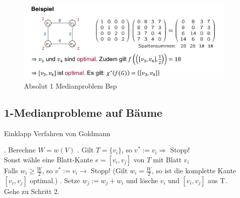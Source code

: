         \begin{exmp}
          
        \end{exmp}

        \begin{figure}[H]
          \centering
          \includegraphics[width=0.95\textwidth]{Images/Absolut_1_Medianproblem.png}
          \caption{Absolut 1 Medianproblem Bsp}
          \label{fig:Absolut_1_Medianproblem-Bsp}
        \end{figure}
       
    

    \subsection{1-Medianprobleme auf Bäume} %
    \label{sub:1_medianprobleme_auf_b_ume}

      \begin{algorithm}[H]
        \begin{algorithmic}
          \caption{Einklapp Verfahren von Goldmann}
          . Berechne $W = w(V)$
          . Gilt $T = \{v_i\}$, so $v^* := v_i \Rightarrow$ Stopp!\\ 
          Sonst wähle eine Blatt-Kante $e = [v_i, v_j]$ von $T$ mit Blatt $v_i$\\ 
          Falls $w_i \geq \frac{W}{2}$, so $v^* := v_i \rightarrow$ Stopp! (Gilt $w_i = \frac{W}{2}$, so ist die komplette Kante $[v_i, v_j]$ optimal.)
          . Setze $w_j:= w_j + w_i$ und lösche $v_i$ und $[v_i, v_j]$ aus T.\\ 
          Gehe zu Schritt 2.
        \end{algorithmic}
      \end{algorithm}

      \begin{exmp}
        
      \end{exmp}

